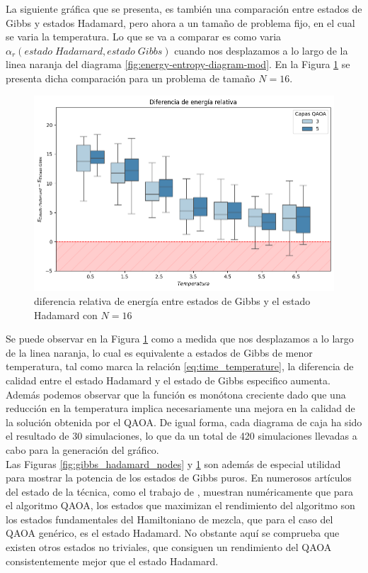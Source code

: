 La siguiente gráfica que se presenta, es también una comparación entre estados de Gibbs y estados Hadamard, pero ahora a un tamaño de problema fijo, en el cual se varia la temperatura. Lo que se va a comparar es como varia $\alpha_{r}(estado \; Hadamard, estado \; Gibbs)$ cuando nos desplazamos a lo largo de la linea naranja del diagrama \ref{fig:energy-entropy-diagram-mod}. En la Figura \ref{fig:gibbs_hadamard_temperature} se presenta dicha comparación para un problema de tamaño $N=16$.

\begin{figure}[!h]
    \centering
    \includegraphics[scale = 0.75]{plt/06-gibbs_vs_hadamard_temperature.png}
    \caption{diferencia relativa de energía entre estados de Gibbs y el estado Hadamard con $N=16$}
    \label{fig:gibbs_hadamard_temperature}
\end{figure}

\newpage

Se puede observar en la Figura \ref{fig:gibbs_hadamard_temperature} como a medida que nos desplazamos a lo largo de la linea naranja, lo cual es equivalente a estados de Gibbs de menor temperatura, tal como marca la relación \ref{eq:time_temperature}, la diferencia de calidad entre el estado Hadamard y el estado de Gibbs especifico aumenta. Además podemos observar que la función es monótona creciente dado que una reducción en la temperatura implica necesariamente una mejora en la calidad de la solución obtenida por el QAOA.  De igual forma, cada diagrama de caja ha sido el resultado de 30 simulaciones, lo que da un total de 420 simulaciones llevadas a cabo para la generación del gráfico. \\

Las Figuras \ref{fig:gibbs_hadamard_nodes} y \ref{fig:gibbs_hadamard_temperature} son además de especial utilidad para mostrar la potencia de los estados de Gibbs puros. En numerosos artículos del estado de la técnica, como el trabajo de \cite{shaydulin}, muestran numéricamente que para el algoritmo QAOA, los estados que maximizan el rendimiento del algoritmo son los estados fundamentales del Hamiltoniano de mezcla, que para el caso del QAOA genérico, es el estado Hadamard. No obstante aquí se comprueba que existen otros estados no triviales, que consiguen un rendimiento del QAOA consistentemente mejor que el estado Hadamard. \\

